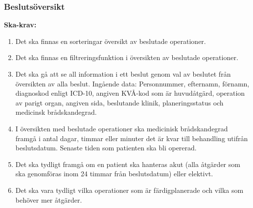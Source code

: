 \documentclass[twoside]{article}
\begin{document}
\subsubsection{Beslutsöversikt}
\textbf{Ska-krav: }
\begin{enumerate}[resume]
  \item Det ska finnas en sorteringar översikt av beslutade operationer.
  \item Det ska finnas en filtreringsfunktion i översikten av beslutade
  operationer.
  \item Det ska gå att se all information i ett beslut genom val av
  beslutet från översikten av alla beslut.
  Ingående data:
  Personnummer, efternamn, förnamn, diagnoskod enligt ICD-10, angiven KVÅ-kod
  som är huvudåtgärd, operation av parigt organ, angiven sida, beslutande
  klinik, planeringsstatus och medicinsk brådskandegrad.
  \item I översikten med beslutade operationer ska medicinisk brådskandegrad
  framgå i antal dagar, timmar eller minuter det är kvar till behandling utifrån
  beslutsdatum. Senaste tiden som patienten ska bli opererad.
  \item Det ska tydligt framgå om en patient ska hanteras akut (alla åtgärder
  som ska genomföras inom 24 timmar från beslutsdatum) eller elektivt.
  \item Det ska vara tydligt vilka operationer som är färdigplanerade och vilka
  som behöver mer åtgärder.
\end{enumerate}
\end{document}
